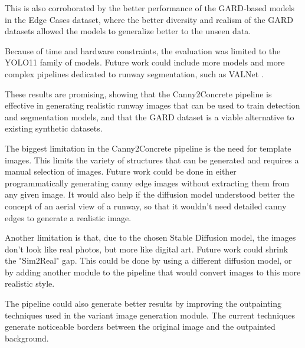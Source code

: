 This is also corroborated by the better performance of the GARD-based models in
the Edge Cases dataset, where the better diversity and realism of the GARD
datasets allowed the models to generalize better to the unseen data.

Because of time and hardware constraints, the evaluation was limited to the
YOLO11 family of models. Future work could include more models and more
complex pipelines dedicated to runway segmentation, such as VALNet
\cite{wang_valnet_2024}.

These results are promising, showing that the Canny2Concrete pipeline is
effective in generating realistic runway images that can be used to train
detection and segmentation models, and that the GARD dataset is a viable
alternative to existing synthetic datasets.

The biggest limitation in the Canny2Concrete pipeline is the need for template
images. This limits the variety of structures that can be generated and requires
a manual selection of images. Future work could be done in either
programmatically generating canny edge images without extracting them from any
given image. It would also help if the diffusion model understood better the
concept of an aerial view of a runway, so that it wouldn't need detailed canny
edges to generate a realistic image.

Another limitation is that, due to the chosen Stable Diffusion model, the
images don't look like real photos, but more like digital art. Future work could
shrink the "Sim2Real" gap. This could be done by using a different diffusion model,
or by adding another module to the pipeline that would convert images to this
more realistic style.

The pipeline could also generate better results by improving the outpainting
techniques used in the variant image generation module. The current techniques
generate noticeable borders between the original image and the outpainted
background.


